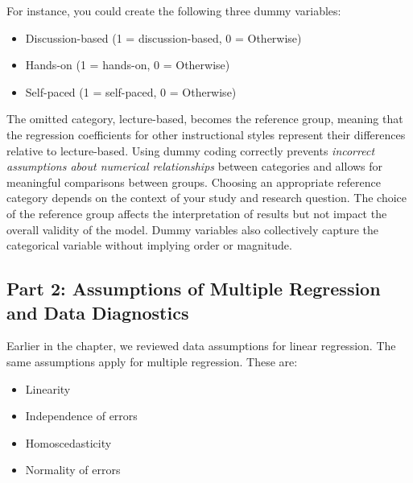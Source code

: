 \documentclass[
  letterpaper,
  DIV=11,
  numbers=noendperiod]{scrreprt}
\begin{document}
For instance, you could create the following three dummy variables:

\begin{itemize}
\item
  Discussion-based (1 = discussion-based, 0 = Otherwise)
\item
  Hands-on (1 = hands-on, 0 = Otherwise)
\item
  Self-paced (1 = self-paced, 0 = Otherwise)
\end{itemize}

The omitted category, lecture-based, becomes the reference group,
meaning that the regression coefficients for other instructional styles
represent their differences relative to lecture-based. Using dummy
coding correctly prevents \emph{incorrect assumptions about numerical
relationships} between categories and allows for meaningful comparisons
between groups. Choosing an appropriate reference category depends on
the context of your study and research question. The choice of the
reference group affects the interpretation of results but not impact the
overall validity of the model. Dummy variables also collectively capture
the categorical variable without implying order or magnitude.

\subsection{Part 2: Assumptions of Multiple Regression and Data
Diagnostics}\label{part-2-assumptions-of-multiple-regression-and-data-diagnostics}

Earlier in the chapter, we reviewed data assumptions for linear
regression. The same assumptions apply for multiple regression. These
are:

\begin{itemize}
\item
  Linearity
\item
  Independence of errors
\item
  Homoscedasticity
\item
  Normality of errors
\end{itemize}
\end{document}
